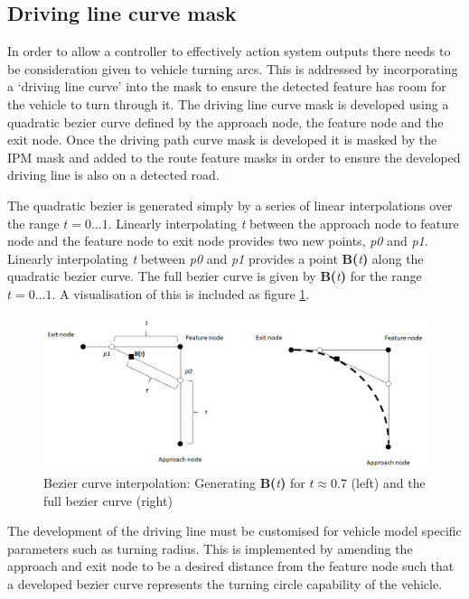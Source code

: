 \documentclass[]{aiaa-tc}%
\begin{document}
\subsection{Driving line curve mask} \label{s:drivingPathMatching}

In order to allow a controller to effectively action system outputs there needs to be consideration given to vehicle turning arcs. This is addressed by incorporating a `driving line curve' into the mask to ensure the detected feature has room for the vehicle to turn through it. The driving line curve mask is developed using a quadratic bezier curve defined by the approach node, the feature node and the exit node. Once the driving path curve mask is developed it is masked by the IPM mask and added to the route feature masks in order to ensure the developed driving line is also on a detected road. 

The quadratic bezier is generated simply by a series of linear interpolations over the range $t=0...1$. Linearly interpolating \textit{t} between the approach node to feature node and the feature node to exit node provides two new points, \textit{p0} and \textit{p1}. Linearly interpolating \textit{t} between \textit{p0} and \textit{p1} provides a point \textbf{B(}\textit{t}\textbf{)} along the quadratic bezier curve. The full bezier curve is given by \textbf{B(}\textit{t}\textbf{)} for the range $t=0...1$. A visualisation of this is included as figure \ref{f:quadraticBezier}.

\begin{figure}
	\centering
	\includegraphics[width=1\textwidth]{bezier/quadraticBezier.png}
	\caption{Bezier curve interpolation: Generating \textbf{B(}\textit{t}\textbf{)} for $t\approx0.7$ (left) and the full bezier curve (right)}
	\label{f:quadraticBezier}
\end{figure}

The development of the driving line must be customised for vehicle model specific parameters such as turning radius. This is implemented by amending the approach and exit node to be a desired distance from the feature node such that a developed bezier curve represents the turning circle capability of the vehicle. 
\end{document}
